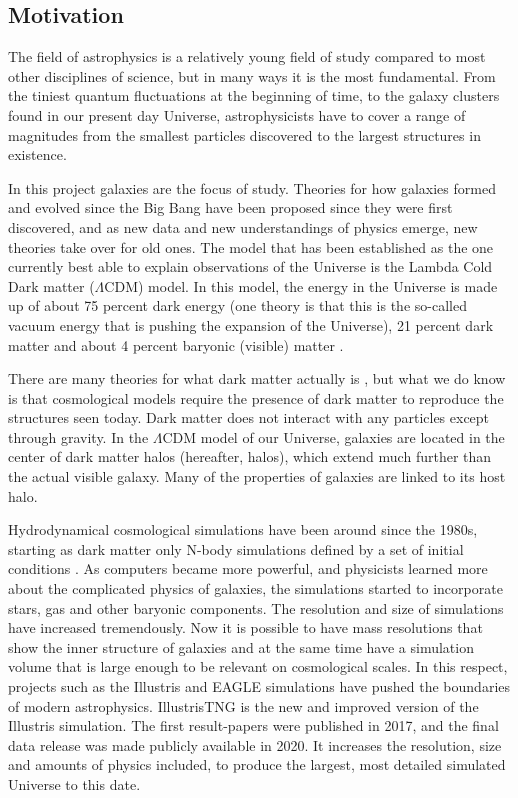 
\noindent
\subsection{Motivation}
The field of astrophysics is a relatively young field of study compared to most other disciplines of science, but in many ways it is the most fundamental. From the tiniest quantum fluctuations at the beginning of time, to the galaxy clusters found in our present day Universe, astrophysicists have to cover a range of magnitudes from the smallest particles discovered to the largest structures in existence. 

In this project galaxies are the focus of study. Theories for how galaxies formed and evolved since the Big Bang have been proposed since they were first discovered, and as new data and new understandings of physics emerge, new theories take over for old ones. The model that has been established as the one currently best able to explain observations of the Universe is the Lambda Cold Dark matter ($\Lambda$CDM) model. In this model, the energy in the Universe is made up of about 75 percent dark energy (one theory is that this is the so-called vacuum energy that is pushing the expansion of the Universe), 21 percent dark matter and about 4 percent baryonic (visible) matter \parencite{Planck2016}. 

There are many theories for what dark matter actually is \parencite[see e.g.,][]{Boveia2018}, but what we do know is that cosmological models require the presence of dark matter to reproduce the structures seen today. Dark matter does not interact with any particles except through gravity. In the $\Lambda$CDM model of our Universe, galaxies are located in the center of dark matter halos (hereafter, halos), which extend much further than the actual visible galaxy. Many of the properties of galaxies are linked to its host halo.

Hydrodynamical cosmological simulations have been around since the 1980s, starting as dark matter only N-body simulations defined by a set of initial conditions \parencite{Frenk1983}. As computers became more powerful, and physicists learned more about the complicated physics of galaxies, the simulations started to incorporate stars, gas and other baryonic components. The resolution and size of simulations have increased tremendously. Now it is possible to have mass resolutions that show the inner structure of galaxies and at the same time have a simulation volume that is large enough to be relevant on cosmological scales. In this respect, projects such as the Illustris and EAGLE simulations have pushed the boundaries of modern astrophysics. IllustrisTNG is the new and improved version of the Illustris simulation. The first result-papers were published in 2017, and the final data release was made publicly available in 2020. It increases the resolution, size and amounts of physics included, to produce the largest, most detailed simulated Universe to this date. 

